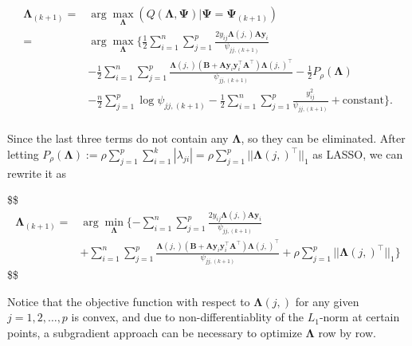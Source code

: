 \documentclass[
  a4paper,
  oneside,
  openany,
  12pt,
  onecolumn]{book}
\theoremstyle{plain}
\theoremstyle{remark}
\begin{document}
\[
\begin{align*}
\boldsymbol{\Lambda}_{(k+1)}=&\arg \max_\boldsymbol{\Lambda} (Q(\boldsymbol{\Lambda,\boldsymbol{\Psi}})|\boldsymbol{\Psi}=\boldsymbol{\Psi}_{(k+1)})\\
=&\arg \max_\boldsymbol{\Lambda} \{\frac{1}{2} \sum_{i=1}^n \sum_{j=1}^p \frac{2y_{ij}\boldsymbol{\Lambda}(j,)\boldsymbol{A}\boldsymbol{y}_i}{\psi_{jj,(k+1)}}\\
&-\frac{1}{2}\sum_{i=1}^n\sum_{j=1}^p\frac{\boldsymbol{\Lambda}(j,)(\boldsymbol{B}+\boldsymbol{A}\boldsymbol{y}_i\boldsymbol{y}_i^\top\boldsymbol{A}^\top)\boldsymbol{\Lambda}(j,)^\top}{\psi_{jj,(k+1)}}-\frac{1}{2}P_{\rho}(\boldsymbol{\Lambda})\\
&-\frac{n}{2}\sum_{j=1}^p\log{\psi_{jj,(k+1)}}-\frac{1}{2}\sum_{i=1}^n\sum_{j=1}^p\frac{y_{ij}^2}{\psi_{jj,(k+1)}}+\text{constant}\}.\\
\end{align*}
\]

Since the last three terms do not contain any \(\boldsymbol{\Lambda}\),
so they can be eliminated. After letting
\(P_\rho(\boldsymbol{\Lambda}):=\rho\sum_{j=1}^p\sum_{i=1}^k|\lambda_{ji}|=\rho \sum_{j=1}^p||\boldsymbol{\Lambda}(j,)^\top||_1\)
as LASSO, we can rewrite it as

\$\$ \begin{align*}
\boldsymbol{\Lambda}_{(k+1)}

=& \arg \min_{\boldsymbol{\Lambda}}\{-\sum_{i=1}^n \sum_{j=1}^p \frac{2y_{ij}\boldsymbol{\Lambda}(j,)\boldsymbol{A}\boldsymbol{y}_i}{\psi_{jj,(k+1)}}\\

& + \sum_{i=1}^n\sum_{j=1}^p\frac{\boldsymbol{\Lambda}(j,)(\boldsymbol{B}+\boldsymbol{A}\boldsymbol{y}_i\boldsymbol{y}_i^\top\boldsymbol{A}^\top)\boldsymbol{\Lambda}(j,)^\top}{\psi_{jj,(k+1)}} + \rho \sum_{j=1}^p||\boldsymbol{\Lambda}(j,)^\top||_1
  \}
\end{align*} \$\$

Notice that the objective function with respect to
\(\boldsymbol{\Lambda}(j,)\) for any given \(j=1,2,\dots,p\) is convex,
and due to non-differentiablity of the \(L_1\)-norm at certain points, a
subgradient approach can be necessary to optimize
\(\boldsymbol{\Lambda}\) row by row.
\end{document}
